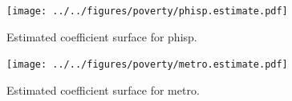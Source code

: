 \documentclass[authoryear ,review]{elsarticle}
\begin{document}
			
			\begin{figure}
				\begin{center}
					\texttt{[image: ../../figures/poverty/phisp.estimate.pdf]}
					\caption{Estimated coefficient surface for phisp.\label{fig:phisp}}
				\end{center}
			\end{figure}
						
			
			\begin{figure}
				\begin{center}
					\texttt{[image: ../../figures/poverty/metro.estimate.pdf]}
					\caption{Estimated coefficient surface for metro.\label{fig:metro}}
				\end{center}
			\end{figure}
			


			


\end{document}

